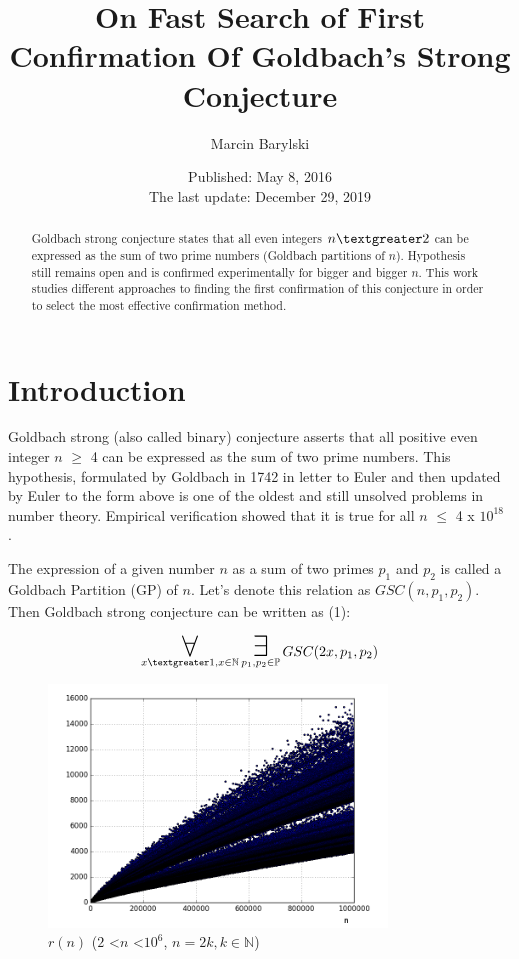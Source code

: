 \documentclass[10pt,twocolumn]{article}
\title{On Fast Search of First Confirmation Of Goldbach's Strong Conjecture}
\author{Marcin Barylski}
\date{\small{Published: May 8, 2016 \\ The last update: December 29, 2019}}
\newcommand\bigforall{\mbox{\huge $\mathsurround5pt\forall$}}
\newcommand\bigexists{\mbox{\huge $\mathsurround5pt\exists$}}
\begin{document}
\maketitle

\begin{abstract}
Goldbach strong conjecture states that all even integers $n \textgreater 2$ can be expressed as the sum of two prime numbers (Goldbach partitions of $n$). Hypothesis still remains open and is confirmed experimentally for bigger and bigger $n$. This work studies different approaches to finding the first confirmation of this conjecture in order to select the most effective confirmation method.
\end{abstract}

\section{Introduction}

Goldbach strong (also called binary) conjecture asserts that all positive even integer $n$ $\geq$ 4 can be expressed as the sum of two prime numbers. This hypothesis, formulated by Goldbach in 1742 in letter to Euler \cite{goldbach1742} and then updated by Euler to the form above is one of the oldest and still unsolved problems in number theory. Empirical verification showed that it is true for all $n$ $\leq$ 4 x $10^{18}$ \cite{oliveira2012}.\par
The expression of a given number $n$ as a sum of two primes $p_1$ and $p_2$ is called a Goldbach Partition (GP) of $n$. Let's denote this relation as $GSC(n, p_1, p_2)$. Then Goldbach strong conjecture can be written as (1):

\begin{equation}
\displaystyle\mathop{\bigforall}_{x \textgreater 1, x \in \mathbb{N}} \displaystyle\mathop{\bigexists}_{p_1, p_2 \in \mathbb{P}} GSC (2x, p_1, p_2)
\end{equation}

\begin{figure}[!ht]
\centering
\includegraphics[width=9cm]{f_pairs}
\caption{$r(n)$ ($2$ \textless $n$ \textless $10^6$, $n = 2k, k \in \mathbb{N}$)}
\label{fig:pairs}
\end{figure}
\end{document}
